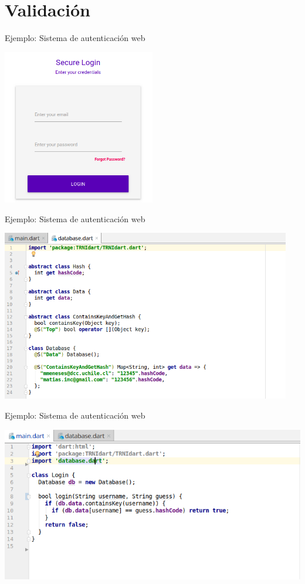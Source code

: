 \documentclass[aspectratio=169,10pt]{beamer}
\begin{document}
\section{Validación}

\begin{frame}[fragile]{Ejemplo: Sistema de autenticación web}
	\begin{center}
		\includegraphics[width=0.5\textwidth]{images/screen4.png}
	\end{center}
\end{frame}

\begin{frame}[fragile]{Ejemplo: Sistema de autenticación web}
	\begin{center}
		\includegraphics[width=0.95\textwidth]{images/database.png}
	\end{center}
\end{frame}

\begin{frame}[fragile]{Ejemplo: Sistema de autenticación web}
	\begin{center}
		\includegraphics[width=1.0\textwidth]{images/login1.png}
	\end{center}
\end{frame}
\end{document}
